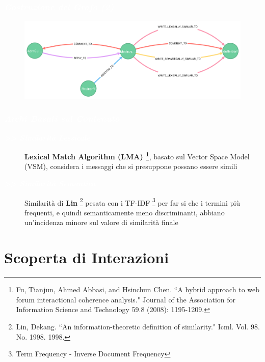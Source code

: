 \documentclass[11pt,xcolor={usenames,dvipsnames,svgnames},compress]{beamer}
\newcommand{\highlighttext}[2][yellow]{{\colorbox{#1}{\textcolor{white}{#2}}}}
\begin{document}
\begin{frame}
  \frametitle{\highlighttext[lacamgreen]{\textbf{\emph{Costruzione del Grafo (2)}}}}
\begin{figure}\centering
\includegraphics[scale=0.40]{img/graph}
\end{figure}

\end{frame}

\begin{frame}
  \frametitle{\highlighttext[lacamgreen]{\textbf{\emph{Archi Basati sul Contenuto}}}}

  \begin{description}
  \item[\textbf{\highlighttext[tomato0]{\textbf{\emph{>> Similarit{\`a} Lessicale}}}}] \textbf{Lexical Match Algorithm (LMA) \footnote{Fu, Tianjun, Ahmed Abbasi, and Hsinchun Chen. ``A hybrid approach to web forum interactional coherence analysis." Journal of the Association for Information Science and Technology 59.8 (2008): 1195-1209.}}, basato sul Vector Space Model (VSM), considera i messaggi che si presuppone possano essere simili \bigskip
  \item[\textbf{\highlighttext[yellow3]{\textbf{\emph{>> Similarit{\`a} Semantica}}}}] Similarit{\`a} di \textbf{Lin} \footnote{Lin, Dekang. ``An information-theoretic definition of similarity." Icml. Vol. 98. No. 1998. 1998.} pesata con i TF-IDF \footnote{Term Frequency - Inverse Document Frequency} per far si che i termini pi{\`u} frequenti, e quindi semanticamente meno discriminanti, abbiano un'incidenza minore sul valore di similarit{\`a} finale
  \end{description} \bigskip

\end{frame}

\section{Scoperta di Interazioni}
{
  \begin{frame}
    \sectionpage
  \end{frame}
}
 
\end{document}
